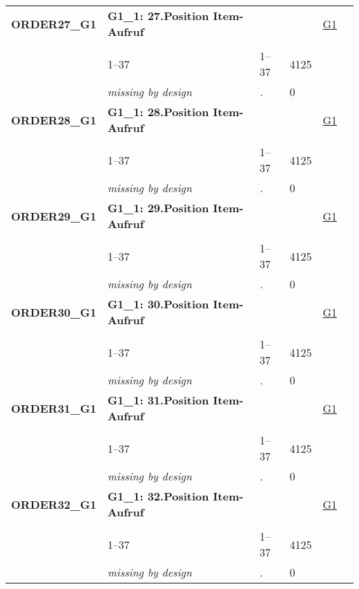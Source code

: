 \begin{longtable}{| L{2.45cm} | L{6cm} | C{1.5cm} | R{1cm} | C{2.25cm} | C{2.25cm} |}
   \midrule
\textbf{ORDER27\_G1}\label{var:ORDER27:G1} & \textbf{G1\_1: 27.Position Item-Aufruf} &  &  & \hyperref[G1]{G1} & \hyperref[var:suf:]{} \\ 
   &  &  &  &  &  \\ 
   & 1--37 & 1--37 & 4125 &  &  \\ 
   & \textit{missing by design} & \textit{.} & 0 &  &  \\ 
   \midrule
\textbf{ORDER28\_G1}\label{var:ORDER28:G1} & \textbf{G1\_1: 28.Position Item-Aufruf} &  &  & \hyperref[G1]{G1} & \hyperref[var:suf:]{} \\ 
   &  &  &  &  &  \\ 
   & 1--37 & 1--37 & 4125 &  &  \\ 
   & \textit{missing by design} & \textit{.} & 0 &  &  \\ 
   \midrule
\textbf{ORDER29\_G1}\label{var:ORDER29:G1} & \textbf{G1\_1: 29.Position Item-Aufruf} &  &  & \hyperref[G1]{G1} & \hyperref[var:suf:]{} \\ 
   &  &  &  &  &  \\ 
   & 1--37 & 1--37 & 4125 &  &  \\ 
   & \textit{missing by design} & \textit{.} & 0 &  &  \\ 
   \midrule
\textbf{ORDER30\_G1}\label{var:ORDER30:G1} & \textbf{G1\_1: 30.Position Item-Aufruf} &  &  & \hyperref[G1]{G1} & \hyperref[var:suf:]{} \\ 
   &  &  &  &  &  \\ 
   & 1--37 & 1--37 & 4125 &  &  \\ 
   & \textit{missing by design} & \textit{.} & 0 &  &  \\ 
   \midrule
\textbf{ORDER31\_G1}\label{var:ORDER31:G1} & \textbf{G1\_1: 31.Position Item-Aufruf} &  &  & \hyperref[G1]{G1} & \hyperref[var:suf:]{} \\ 
   &  &  &  &  &  \\ 
   & 1--37 & 1--37 & 4125 &  &  \\ 
   & \textit{missing by design} & \textit{.} & 0 &  &  \\ 
   \midrule
\textbf{ORDER32\_G1}\label{var:ORDER32:G1} & \textbf{G1\_1: 32.Position Item-Aufruf} &  &  & \hyperref[G1]{G1} & \hyperref[var:suf:]{} \\ 
   &  &  &  &  &  \\ 
   & 1--37 & 1--37 & 4125 &  &  \\ 
   & \textit{missing by design} & \textit{.} & 0 &  &  \\ 

\end{longtable}
